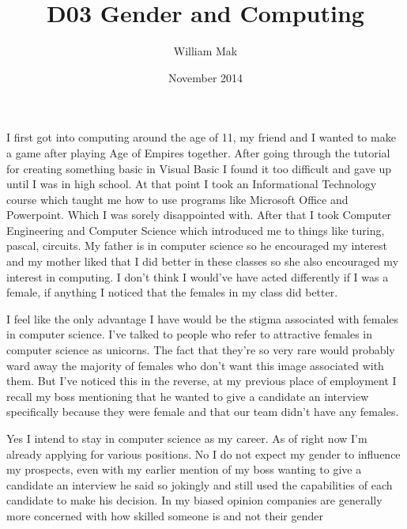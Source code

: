 \documentclass{article}
\title{D03 Gender and Computing}
\author{William Mak}
\date{November 2014}
\begin{document}
\maketitle

I first got into computing around the age of 11, my friend and I wanted to make
a game after playing Age of Empires together. After going through the tutorial
for creating something basic in Visual Basic I found it too difficult and gave
up until I was in high school. At that point I took an Informational Technology
course which taught me how to use programs like Microsoft Office and Powerpoint.
Which I was sorely disappointed with. After that I took Computer Engineering and
Computer Science which introduced me to things like turing, pascal, circuits. My
father is in computer science so he encouraged my interest and my mother liked
that I did better in these classes so she also encouraged my interest in
computing. I don't think I would've have acted differently if I was a female, if
anything I noticed that the females in my class did better. 

I feel like the only advantage I have would be the stigma associated with
females in computer science. I've talked to people who refer to attractive
females in computer science as unicorns. The fact that they're so very rare
would probably ward away the majority of females who don't want this image
associated with them. But I've noticed this in the reverse, at my previous place
of employment I recall my boss mentioning that he wanted to give a candidate an
interview specifically because they were female and that our team didn't have
any females.

Yes I intend to stay in computer science as my career. As of right now I'm
already applying for various positions. No I do not expect my gender to
influence my prospects, even with my earlier mention of my boss wanting to give
a candidate an interview he said so jokingly and still used the capabilities of
each candidate to make his decision. In my biased opinion companies are
generally more concerned with how skilled someone is and not their gender
\end{document}
